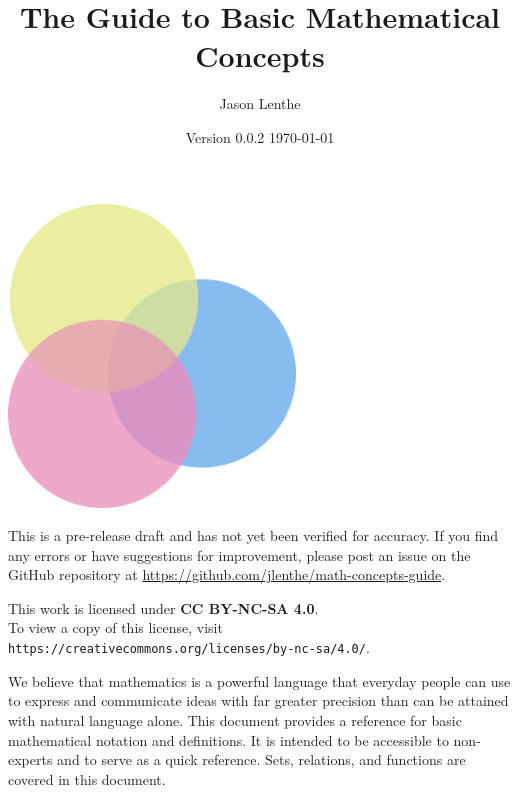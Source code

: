 \documentclass[letterpaper]{article}
\title{\sffamily\textbf{The Guide to Basic Mathematical Concepts}}
\author{\sffamily Jason Lenthe}
\date{Version 0.0.2 \quad \today}
\begin{document}
\maketitle
\vskip 0.5in
\begin{center}
    \includegraphics[width=3in]{images/logo.png}
\end{center}

\vfill
\begin{warning}
  This is a pre-release draft and has not yet been verified for accuracy.
  If you find any errors or have suggestions for improvement, please post
  an issue on the GitHub repository at
  \url{https://github.com/jlenthe/math-concepts-guide}.
\end{warning}
\begin{center}
    {\small This work is licensed under \textbf{CC BY-NC-SA 4.0}.\\
    To view a copy of this license, visit \texttt{https://creativecommons.org/licenses/by-nc-sa/4.0/}.}
\end{center}

\newpage
\tableofcontents
\newpage

We believe that mathematics is a powerful language that everyday people can
use to express and communicate ideas with far greater precision than can be
attained with natural language alone. This document provides a reference for
basic mathematical notation and definitions. It is intended to be accessible
to non-experts and to serve as a quick reference. Sets, relations, and
functions are covered in this document.









% 
\end{document}
